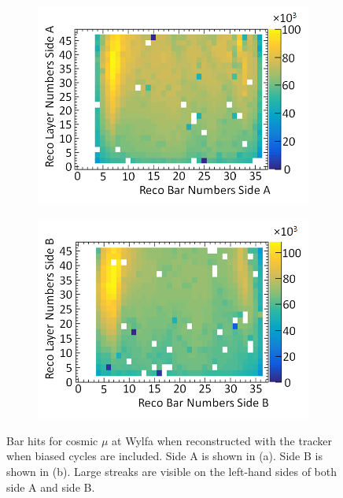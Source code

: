 \begin{figure}[!h]
\centering
\begin{subfigure}{.5\textwidth}
  \centering
  \includegraphics[width=\linewidth]{Chapter6/Figs/Raster/sideAHitsWithBadCyclesMedText.png}
  \captionsetup{width=.9\linewidth}
  \caption{} 
  \label{subFig:sideAHitsWithBadCycles}
\end{subfigure}%
\begin{subfigure}{.5\textwidth}
  \centering
\includegraphics[width=\linewidth]{Chapter6/Figs/Raster/sideBHitsWithBadCyclesMedText.png}
  \captionsetup{width=.9\linewidth}
  \caption{}
  \label{subFig:sideBHitsWithBadCycles}
\end{subfigure}
\caption{Bar hits for cosmic $\mu$ at Wylfa when reconstructed with the tracker when biased cycles are included. Side A is shown in (a). Side B is shown in (b). Large streaks are visible on the left-hand sides of both side A and side B.}
\label{fig:sideABHitsWithBadCycles}
\end{figure}

